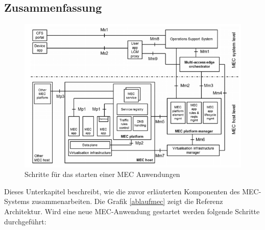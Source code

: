 \documentclass[runningheads]{llncs}
\numberwithin{figure}{section}
\begin{document}
\subsection{Zusammenfassung}
\begin{figure}
  \includegraphics[width=\linewidth]{images/mecarchitecture.png}
  \caption{Schritte für das starten einer MEC Anwendungen}
  \label{fig:ablaufmec}
\end{figure}
Dieses Unterkapitel beschreibt, wie die zuvor erläuterten Komponenten des MEC-Systems zusammenarbeiten. Die Grafik \ref{ablaufmec} zeigt die 
Referenz Architektur. Wird eine neue MEC-Anwendung gestartet werden folgende Schritte durchgeführt:
\end{document}
